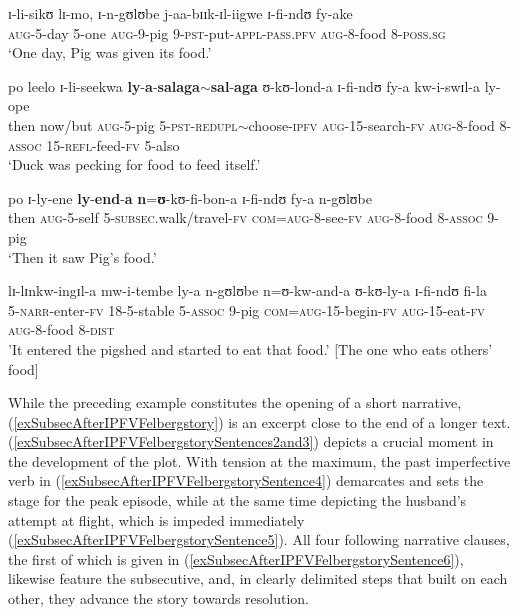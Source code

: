 \begin{exe}
\ex \label{exSubsecPigDuck}
\begin{xlist}
\ex \label{exSubsecPigDuckSentence1}\gll ɪ-li-sikʊ lɪ-mo, ɪ-n-gʊlʊbe j-aa-bɪɪk-ɪl-iigwe ɪ-fi-ndʊ fy-ake\\
\textsc{aug}-5-day 5-one \textsc{aug}-9-pig 9-\textsc{pst}-put-\textsc{appl}-\textsc{pass.pfv} \textsc{aug}-8-food 8-\textsc{poss.sg}\\
\glt `One day, Pig was given its food.'

\ex\label{exSubsecPigDuckSentence2}\gll po leelo ɪ-li-seekwa \textbf{ly}-\textbf{a}-\textbf{salaga}$\sim$\textbf{sal}-\textbf{aga} ʊ-kʊ-lond-a ɪ-fi-ndʊ fy-a kw-i-swɪl-a ly-ope\\
then now/but \textsc{aug}-5-pig 5-\textsc{pst}-\textsc{redupl}$\sim$choose-\textsc{ipfv} \textsc{aug}-15-search-\textsc{fv} \textsc{aug}-8-food 8-\textsc{assoc} 15-\textsc{refl}-feed-\textsc{fv} 5-also\\
\glt `Duck was pecking for food to feed itself.'

\ex\label{exSubsecPigDuckSentence3}\gll po ɪ-ly-ene \textbf{ly}-\textbf{end}-\textbf{a} \textbf{n}=\textbf{ʊ}-kʊ-fi-bon-a ɪ-fi-ndʊ fy-a n-gʊlʊbe\\
then \textsc{aug}-5-self 5-\textsc{subsec}.walk/travel-\textsc{fv} \textsc{com}=\textsc{aug}-8-see-\textsc{fv} \textsc{aug}-8-food 8-\textsc{assoc} 9-pig\\
\glt `Then it saw Pig's food.'

\ex\label{exSubsecPigDuckSentence4}\gll lɪ-lɪnkw-ingɪl-a mw-i-tembe ly-a n-gʊlʊbe n=ʊ-kw-and-a ʊ-kʊ-ly-a ɪ-fi-ndʊ fi-la\\
5-\textsc{narr}-enter-\textsc{fv} 18-5-stable 5-\textsc{assoc} 9-pig \textsc{com}=\textsc{aug}-15-begin-\textsc{fv} \textsc{aug}-15-eat-\textsc{fv} \textsc{aug}-8-food 8-\textsc{dist}\\ \largerpage
\glt  '‎‎It entered the pigshed and started to eat that food.' [The one who eats others' food]
\end{xlist}
\end{exe}

While the preceding example constitutes the opening of a short narrative, (\ref{exSubsecAfterIPFVFelbergstory}) is an excerpt close to the end of a longer text.
(\ref{exSubsecAfterIPFVFelbergstorySentences2and3}) depicts a crucial moment in the development of the plot. With tension at the maximum, the past imperfective verb in (\ref{exSubsecAfterIPFVFelbergstorySentence4}) demarcates and sets the stage for the peak episode, while at the same time depicting the husband's attempt at flight, which is impeded immediately (\ref{exSubsecAfterIPFVFelbergstorySentence5}). All four following narrative clauses, the first of which is given in (\ref{exSubsecAfterIPFVFelbergstorySentence6}), likewise feature the subsecutive, and, in clearly delimited steps that built on each other, they advance the story towards resolution.

